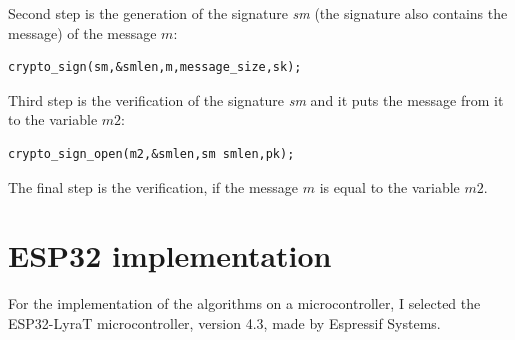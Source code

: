 \documentclass[thesis=M,english]{FITthesis}[2019/12/23]
\begin{document}
\bigskip
\noindent
Second step is the generation of the signature \textit{sm} (the signature also contains the message) of the message $m$:
\begin{lstlisting}[frame=single]
crypto_sign(sm,&smlen,m,message_size,sk);
\end{lstlisting}

\bigskip
\noindent
Third step is the verification of the signature \textit{sm} and it puts the message from it to the variable $m2$:
\begin{lstlisting}[frame=single]
crypto_sign_open(m2,&smlen,sm smlen,pk);
\end{lstlisting}

\noindent
The final step is the verification, if the message $m$ is equal to the variable $m2$.

\newpage
\section{ESP32 implementation} \label{ESP32_impl}
For the implementation of the algorithms on a microcontroller, I selected the ESP32-LyraT microcontroller, version 4.3, made by Espressif Systems.
\end{document}

